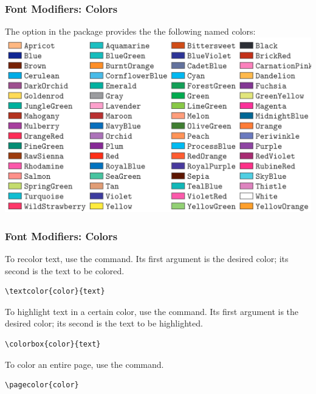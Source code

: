 \begin{frame}[fragile]
\frametitle{Font Modifiers: Colors}
The  option in the  package provides the the following named colors:\\
\includegraphics[width=\linewidth]{img/dvipsnamesXcolor.png}
\end{frame}


\begin{frame}[fragile]
\frametitle{Font Modifiers: Colors}
To recolor text, use the  command. 
Its first argument is the desired color; its second is the text to be colored. 
\begin{exampleblock}{}
\begin{verbatim}
\textcolor{color}{text}
\end{verbatim}
\end{exampleblock} \pause
To highlight text in a certain color, use the  command. 
Its first argument is the desired color; its second is the text to be highlighted.
\begin{exampleblock}{}
\begin{verbatim}
\colorbox{color}{text}
\end{verbatim}
\end{exampleblock} \pause
To color an entire page, use the  command. 
\begin{exampleblock}{}
\begin{verbatim}
\pagecolor{color}
\end{verbatim}
\end{exampleblock}
\end{frame}



